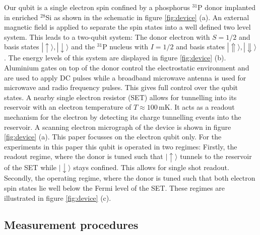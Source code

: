 \documentclass[%
 reprint,
 amsmath,amssymb,
 aps,
]{revtex4-1}
\newcommand {\ket} [1] {|{ #1 \rangle}}
\begin{document}
Our qubit is a single electron spin confined by a phosphorus $^{31}$P donor implanted in enriched $^{28}$Si as shown in the schematic in figure \ref{fig:device} (a). An external magnetic field is applied to separate the spin states into a well defined two level system. This leads to a two-qubit system: The donor electron with $S=1/2$ and basis states $\ket{\uparrow},\ket{\downarrow}$ and the $^{31}$P nucleus with $I=1/2$ and basis states $\ket{\Uparrow},\ket{\Downarrow}$. The energy levels of this system are displayed in figure \ref{fig:device} (b). Aluminium gates on top of the donor control the electrostatic environment and are used to apply DC pulses while a broadband microwave antenna is used for microwave and radio frequency pulses. This gives full control over the qubit states. A nearby single electron resistor (SET) allows for tunnelling into its reservoir with an electron temperature of $T\approx 100\,$mK. It acts as a readout mechanism for the electron by detecting its charge tunnelling events into the reservoir. A scanning electron micrograph of the device is shown in figure \ref{fig:device} (a). This paper focusses on the electron qubit only. For the experiments in this paper this qubit is operated in two regimes: Firstly, the readout regime, where the donor is tuned such that $\ket{\uparrow}$ tunnels to the reservoir of the SET while $\ket{\downarrow}$ stays confined. This allows for single shot readout. Secondly, the operating regime, where the donor is tuned such that both electron spin states lie well below the Fermi level of the SET. These regimes are illustrated in figure \ref{fig:device} (c). 


\subsection{\label{sec:Measurementprocedures} Measurement procedures}
\end{document}

